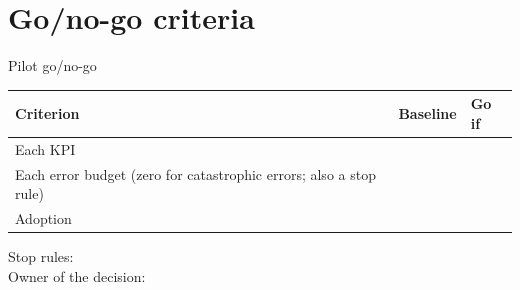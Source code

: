 \section{Go/no-go criteria}

\begin{template}{Pilot go/no-go}
\begin{tabular}{@{}lll@{}}
Criterion & Baseline & Go if \\
\hline
Each KPI & & \\
Each error budget (zero for catastrophic errors; also a stop rule) & & \\
Adoption & & \\
\end{tabular}

\smallskip
Stop rules: \underline{\hspace{9cm}}\\
Owner of the decision: \underline{\hspace{8cm}}
\end{template}
